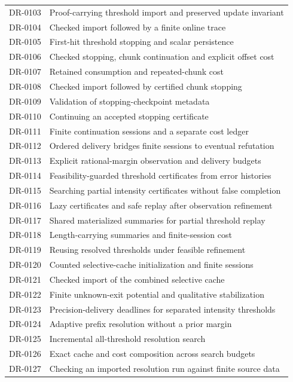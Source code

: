 \begin{longtable}{p{.14\linewidth}p{.79\linewidth}}
DR-0103 & Proof-carrying threshold import and preserved update invariant\\
DR-0104 & Checked import followed by a finite online trace\\
DR-0105 & First-hit threshold stopping and scalar persistence\\
DR-0106 & Checked stopping, chunk continuation and explicit offset cost\\
DR-0107 & Retained consumption and repeated-chunk cost\\
DR-0108 & Checked import followed by certified chunk stopping\\
DR-0109 & Validation of stopping-checkpoint metadata\\
DR-0110 & Continuing an accepted stopping certificate\\
DR-0111 & Finite continuation sessions and a separate cost ledger\\
DR-0112 & Ordered delivery bridges finite sessions to eventual refutation\\
DR-0113 & Explicit rational-margin observation and delivery budgets\\
DR-0114 & Feasibility-guarded threshold certificates from error histories\\
DR-0115 & Searching partial intensity certificates without false completion\\
DR-0116 & Lazy certificates and safe replay after observation refinement\\
DR-0117 & Shared materialized summaries for partial threshold replay\\
DR-0118 & Length-carrying summaries and finite-session cost\\
DR-0119 & Reusing resolved thresholds under feasible refinement\\
DR-0120 & Counted selective-cache initialization and finite sessions\\
DR-0121 & Checked import of the combined selective cache\\
DR-0122 & Finite unknown-exit potential and qualitative stabilization\\
DR-0123 & Precision-delivery deadlines for separated intensity thresholds\\
DR-0124 & Adaptive prefix resolution without a prior margin\\
DR-0125 & Incremental all-threshold resolution search\\
DR-0126 & Exact cache and cost composition across search budgets\\
DR-0127 & Checking an imported resolution run against finite source data\\

\end{longtable}
